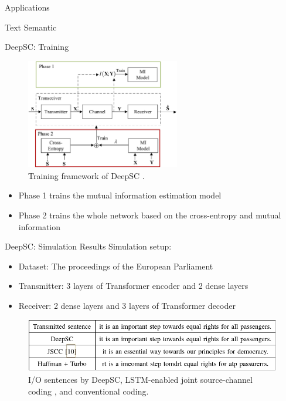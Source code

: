 \documentclass[presentation,mathserif,9pt]{beamer}
\begin{document}
\begin{section}{Applications}
\begin{subsection}{Text Semantic}
		\begin{frame}{DeepSC: Training}
			\begin{figure}
				\includegraphics[width=0.6\textwidth]{assets/deepsc_training.jpg}
				\caption{Training framework of DeepSC \cite{Xie2021a}.}
			\end{figure}
			\begin{itemize}
				\item Phase 1 trains the mutual information estimation model
				\item Phase 2 trains the whole network based on the cross-entropy and mutual information
			\end{itemize}
		\end{frame}

		\begin{frame}{DeepSC: Simulation Results}
			Simulation setup:
			\begin{itemize}
				\item Dataset: The proceedings of the European Parliament
				\item Transmitter: 3 layers of Transformer encoder and 2 dense layers
				\item Receiver: 2 dense layers and 3 layers of Transformer decoder
			\end{itemize}
			\begin{figure}
				\includegraphics[width=\textwidth]{assets/deepsc_sentences.jpg}
				\caption{I/O sentences by DeepSC, LSTM-enabled joint source-channel coding \cite{Bourtsoulatze2019}, and conventional coding.}
			\end{figure}
		\end{frame}


\end{subsection}
\end{section}
\end{document}
